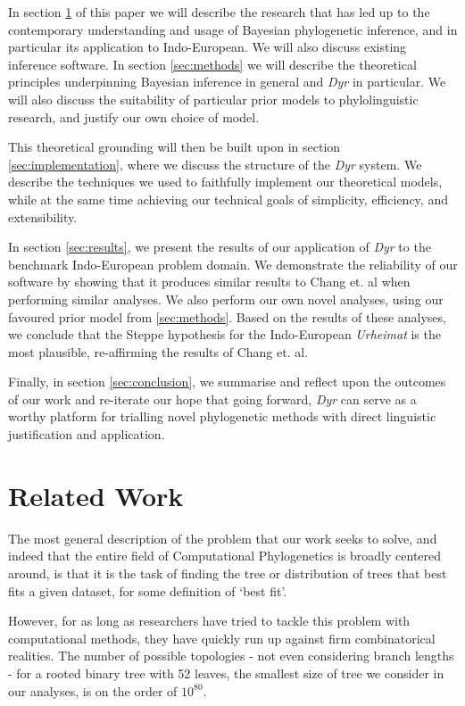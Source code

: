 \documentclass[10pt,journal,compsoc]{IEEEtran}
\begin{document}
In section \ref{sec:related} of this paper we will describe the research that has led up to the contemporary understanding and usage of Bayesian phylogenetic inference, and in particular its application to Indo-European. We will also discuss existing inference software. In section \ref{sec:methods} we will describe the theoretical principles underpinning Bayesian inference in general and \textit{Dyr} in particular. We will also discuss the suitability of particular prior models to phylolinguistic research, and justify our own choice of model. 

This theoretical grounding will then be built upon in section \ref{sec:implementation}, where we discuss the structure of the \textit{Dyr} system. We describe the techniques we used to faithfully implement our theoretical models, while at the same time achieving our technical goals of simplicity, efficiency, and extensibility.

In section \ref{sec:results}, we present the results of our application of \textit{Dyr} to the benchmark Indo-European problem domain. We demonstrate the reliability of our software by showing that it produces similar results to Chang et. al when performing similar analyses. We also perform our own novel analyses, using our favoured prior model from \ref{sec:methods}. Based on the results of these analyses, we conclude that the Steppe hypothesis for the Indo-European \textit{Urheimat} is the most plausible, re-affirming the results of Chang et. al.   

Finally, in section \ref{sec:conclusion}, we summarise and reflect upon the outcomes of our work and re-iterate our hope that going forward, \textit{Dyr} can serve as a worthy platform for trialling novel phylogenetic methods with direct linguistic justification and application.

\section{Related Work}\label{sec:related}

The most general description of the problem that our work seeks to solve, and indeed that the entire field of Computational Phylogenetics is broadly centered around, is that it is the task of finding the tree or distribution of trees that best fits a given dataset, for some definition of `best fit'.

However, for as long as researchers have tried to tackle this problem with computational methods, they have quickly run up against firm combinatorical realities. The number of possible topologies - not even considering branch lengths - for a rooted binary tree with 52 leaves, the smallest size of tree we consider in our analyses, is on the order of $10^{80}$.\cite{felsenstein2004inferring}
\end{document}
